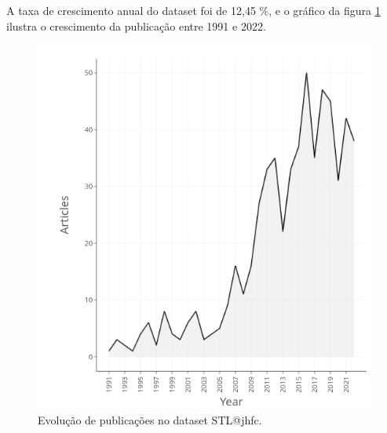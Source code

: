 A taxa de crescimento anual do dataset foi de 12,45 \%, e o gráfico da figura \ref{STL@jhcf-Crescimento} ilustra o crescimento da publicação entre 1991 e 2022.

\begin{figure}
    \centering
    \includegraphics[width=\textwidth]{exploratory-data-analysis/jhcf/PesqBibliogr/SimulacaoSalaDeAula/STL@jhcf/figs/STL@jhcf-Annual-Scientific-Production.png}
    \caption{Evolução de publicações no dataset STL@jhfc.}
    \label{STL@jhcf-Crescimento}
\end{figure}